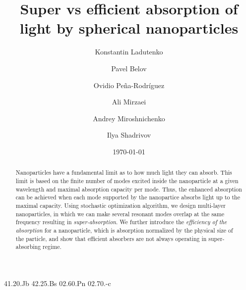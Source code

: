 \documentclass[aps,prl,twocolumn,showpacs,superscriptaddress,groupedaddress]{revtex4-1}
\begin{document}

\title{Super vs efficient absorption of light by spherical
  nanoparticles} %


\author{Konstantin Ladutenko} 


\author{Pavel Belov} 

\author{Ovidio Pe\~{n}a-Rodr\'{i}guez} 

\author{Ali Mirzaei} \author{Andrey Miroshnichenko} \author{Ilya
  Shadrivov} 

\date{\today}

\begin{abstract}
  Nanoparticles have a fundamental limit as to how much light they can
  absorb. This limit is based on the finite number of modes excited
  inside the nanoparticle at a given wavelength and maximal absorption
  capacity per mode. Thus, the enhanced absorption can be achieved
  when each mode supported by the nanopartice absorbs light up to the
  maximal capacity. Using stochastic optimization algorithm, we design
  multi-layer nanoparticles, in which we can make several resonant
  modes overlap at the same frequency resulting in {\it
    super-absorption}.  We further introduce the {\it efficiency of
    the absorption} for a nanoparticle, which is absorption normalized
  by the physical size of the particle, and show that efficient
  absorbers are not always operating in super-absorbing regime.
\end{abstract}


\pacs%
{41.20.Jb 42.25.Bs 02.60.Pn 02.70.-c}
\end{document}
